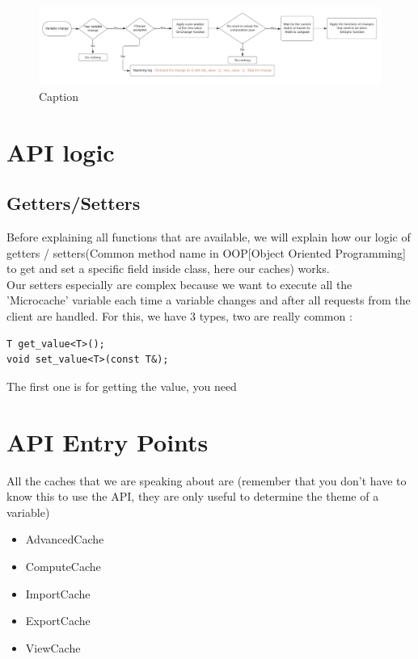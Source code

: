 \documentclass[
 reprint,
 superscriptaddress,
 amsmath,
 amssymb,
 aps,
]{revtex4-2}
\begin{document}
\begin{figure}
    \centering
    \includegraphics[width=\linewidth]{Holovibes, Microcache Pipeline.png}
    \caption{Caption}
    \label{fig_pipeline}
\end{figure}

\section{API logic}

\subsection{Getters/Setters}
Before explaining all functions that are available, we will explain how our logic of getters / setters(Common method name in OOP[Object Oriented Programming] to get and set a specific field inside class, here our caches) works.\\
Our setters especially are complex because we want to execute all the 'Microcache' variable each time a variable changes and after all requests from the client are handled. For this, we have 3 types, two are really common : 

\begin{lstlisting}
T get_value<T>();
void set_value<T>(const T&);
\end{lstlisting}

The first one is for getting the value, you need 

\section{API Entry Points}
All the caches that we are speaking about are (remember that you don't have to know this to use the API, they are only useful to determine the theme of a variable)
\begin{itemize}
    \item AdvancedCache 
    \item ComputeCache
    \item ImportCache
    \item ExportCache
    \item ViewCache
\end{itemize}
\end{document}
